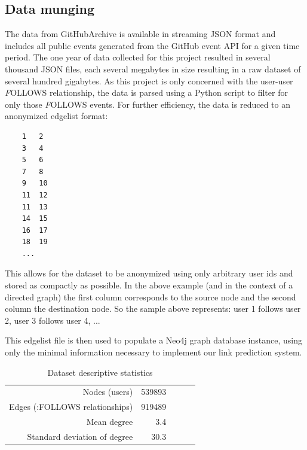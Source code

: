 \subsection{Data munging}
The data from GitHubArchive is available in streaming JSON format and includes all public events generated from the GitHub event API \cite{github:Online} for a given time period. The one year of data collected for this project resulted in several thousand JSON files, each several megabytes in size resulting in a raw dataset of several hundred gigabytes. As this project is only concerned with the user-user {\textit FOLLOWS} relationship, the data is parsed using a Python script to filter for only those {\textit FOLLOWS} events. For further efficiency, the data is reduced to an anonymized edgelist format:
\begin{verbatim}
    1	2
    3	4
    5	6
    7	8
    9	10
    11	12
    11	13
    14	15
    16	17
    18	19
    ...
\end{verbatim}
This allows for the dataset to be anonymized using only arbitrary user ids and stored as compactly as possible. In the above example (and in the context of a directed graph) the first column corresponds to the source node and the second column the destination node. So the sample above represents: user 1 follows user 2, user 3 follows user 4, ...

This edgelist file is then used to populate a Neo4j graph database instance, using only the minimal information necessary to implement our link prediction system. 

\begin{table}[t]
\caption{Dataset descriptive statistics}
\label{results}
\vskip 0.15in
\begin{center}
\begin{small}
\begin{sc}
\begin{tabular}{rrccr}
\hline
Nodes (users) & 539893  \\
Edges (:FOLLOWS relationships) & 919489 \\
Mean degree & 3.4 \\
Standard deviation of degree & 30.3 \\
\hline
\end{tabular}
\end{sc}
\end{small}
\end{center}
\vskip -0.1in
\end{table}


